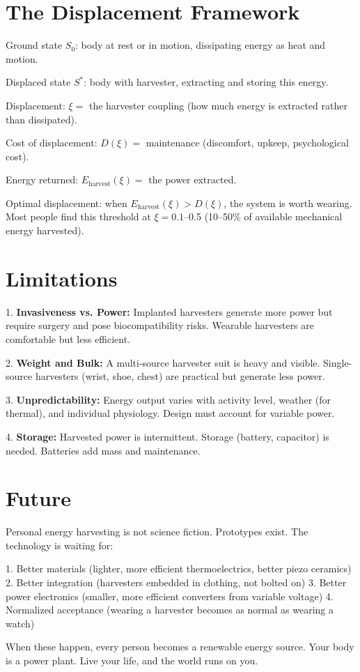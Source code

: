 \documentclass[12pt]{article}
\begin{document}
\section{The Displacement Framework}

Ground state $S_0$: body at rest or in motion, dissipating energy as heat and motion.

Displaced state $S^*$: body with harvester, extracting and storing this energy.

Displacement: $\xi = $ the harvester coupling (how much energy is extracted rather than dissipated).

Cost of displacement: $D(\xi) = $ maintenance (discomfort, upkeep, psychological cost).

Energy returned: $E_{\text{harvest}}(\xi) = $ the power extracted.

Optimal displacement: when $E_{\text{harvest}}(\xi) > D(\xi)$, the system is worth wearing. Most people find this threshold at $\xi = 0.1$–0.5 (10–50\% of available mechanical energy harvested).

\section{Limitations}

1. \textbf{Invasiveness vs. Power:} Implanted harvesters generate more power but require surgery and pose biocompatibility risks. Wearable harvesters are comfortable but less efficient.

2. \textbf{Weight and Bulk:} A multi-source harvester suit is heavy and visible. Single-source harvesters (wrist, shoe, chest) are practical but generate less power.

3. \textbf{Unpredictability:} Energy output varies with activity level, weather (for thermal), and individual physiology. Design must account for variable power.

4. \textbf{Storage:} Harvested power is intermittent. Storage (battery, capacitor) is needed. Batteries add mass and maintenance.

\section{Future}

Personal energy harvesting is not science fiction. Prototypes exist. The technology is waiting for:

1. Better materials (lighter, more efficient thermoelectrics, better piezo ceramics)
2. Better integration (harvesters embedded in clothing, not bolted on)
3. Better power electronics (smaller, more efficient converters from variable voltage)
4. Normalized acceptance (wearing a harvester becomes as normal as wearing a watch)

When these happen, every person becomes a renewable energy source. Your body is a power plant. Live your life, and the world runs on you.
\end{document}
